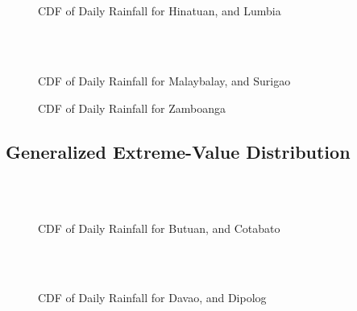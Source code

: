 \begin{figure}[H]
  \centering
  \\
  \\
  \caption{CDF of Daily Rainfall for Hinatuan, and Lumbia}
  \label{fig:daily_without_threshold_appendix_gpd_pt4}
\end{figure}

\begin{figure}[H]
  \centering
  \\
  \\
  \caption{CDF of Daily Rainfall for Malaybalay, and Surigao}
  \label{fig:daily_without_threshold_appendix_gpd_pt5}
\end{figure}

\begin{figure}[H]
  \centering
  \caption{CDF of Daily Rainfall for Zamboanga}
  \label{fig:daily_without_threshold_appendix_gpd_pt6}
\end{figure}

\subsection{Generalized Extreme-Value Distribution}

\begin{figure}[H]
  \centering
  \\
  \\
  \caption{CDF of Daily Rainfall for Butuan, and Cotabato}
  \label{fig:daily_without_threshold_appendix_gev_pt1}
\end{figure}

\begin{figure}[H]
  \centering
  \\
  \\
  \caption{CDF of Daily Rainfall for Davao, and Dipolog}
  \label{fig:daily_without_threshold_appendix_gev_pt2}
\end{figure}

